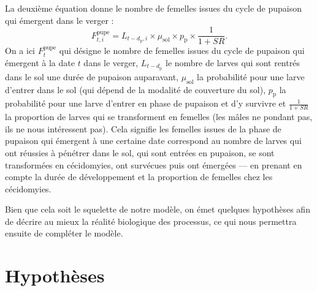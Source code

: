 La deuxième équation donne le nombre de femelles issues du cycle de pupaison qui émergent dans le verger :
\begin{equation}
F^{\text{pupe}}_{t, i} = L_{t - d_{\text{p}}, i} \times \mu_{\text{sol}} \times p_{\text{p}} \times \frac{1}{1 + \mathit{SR}}.
\label{eq:fpupe}
\end{equation}
On a ici $F^{\text{pupe}}_{t}$ qui désigne le nombre de femelles issues du cycle de pupaison qui émergent à la date $t$ dans le verger, $L_{t - d_{\text{p}}}$ le nombre de larves qui sont rentrés dans le sol une durée de pupaison auparavant, $\mu_{\text{sol}}$ la probabilité pour une larve d'entrer dans le sol (qui dépend de la modalité de couverture du sol), $p_{\text{p}}$ la probabilité pour une larve d'entrer en phase de pupaison et d'y survivre et $\frac{1}{1 + \mathit{SR}}$ la proportion de larves qui se transforment en femelles (les mâles ne pondant pas, ils ne nous intéressent pas).
Cela signifie les femelles issues de la phase de pupaison qui émergent à une certaine date correspond au nombre de larves qui ont réussies à pénétrer dans le sol, qui sont entrées en pupaison, se sont transformées en cécidomyies, ont survécues puis ont émergées --- en prenant en compte la durée de développement et la proportion de femelles chez les cécidomyies.

Bien que cela soit le squelette de notre modèle, on émet quelques hypothèses afin de décrire au mieux la réalité biologique des processus, ce qui nous permettra ensuite de compléter le modèle.



\section{Hypothèses}

